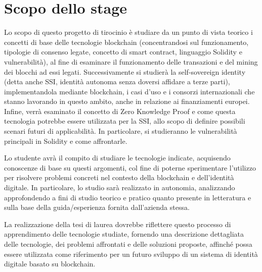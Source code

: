 \section*{Scopo dello stage}
Lo scopo di questo progetto di tirocinio è studiare da un punto di vista teorico
i concetti di base delle tecnologie blockchain (concentrandosi sul funzionamento, tipologie di consenso legate,
concetto di smart contract, linguaggio Solidity e vulnerabilità), al fine di esaminare il funzionamento delle transazioni
e del mining dei blocchi ad essi legati.
Successivamente si studierà la self-sovereign identity (detta anche SSI, identità autonoma senza doversi affidare a terze parti), implementandola
mediante blockchain, i casi d'uso e i consorzi internazionali che stanno lavorando in questo ambito, anche in relazione ai finanziamenti europei.
Infine, verrà esaminato il concetto di Zero Knowledge Proof e come questa tecnologia potrebbe essere utilizzata per la SSI, allo scopo di definire 
possibili scenari futuri di applicabilità. In particolare, si studieranno le vulnerabilità principali in Solidity e come affrontarle.

\medskip

Lo studente avrà il compito di studiare le tecnologie indicate, acquisendo conoscenze di base su questi argomenti, col fine di poterne sperimentare l'utilizzo per risolvere problemi concreti nel contesto della blockchain e dell'identità digitale.
In particolare, lo studio sarà realizzato in autonomia, analizzando approfondendo a fini di studio teorico e pratico 
quanto presente in letteratura e sulla base della guida/esperienza fornita dall'azienda stessa.

\medskip
La realizzazione della tesi di laurea dovrebbe riflettere questo processo di apprendimento delle tecnologie studiate, fornendo una descrizione dettagliata delle tecnologie, dei problemi affrontati e delle soluzioni proposte,
affinché possa essere utilizzata come riferimento per un futuro sviluppo di un sistema di identità digitale basato su blockchain.

\newpage


